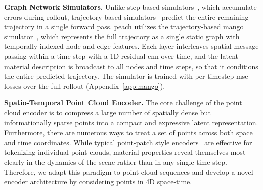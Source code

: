 \textbf{Graph Network Simulators.}
Unlike step-based simulators~\citep{pfaff2020learning, wurth2025diffusion}, which accumulate errors during rollout, trajectory-based simulators~\citep{dahlinger2025mango, dahlinger2025context, egno2024} predict the entire remaining trajectory in a single forward pass.
\gls{peach} utilizes the trajectory-based \gls{mango} simulator~\citep{dahlinger2025mango}, which represents the full trajectory as a single static graph with temporally indexed node and edge features. Each layer interleaves spatial message passing within a time step with a 1D residual \gls{cnn} over time, and the latent material description is broadcast to all nodes and time steps, so that it conditions the entire predicted trajectory. The simulator is trained with per-timestep \gls{mse} losses over the full rollout (Appendix~\ref{app:mango}).




\textbf{Spatio-Temporal Point Cloud Encoder.}
The core challenge of the point cloud encoder is to compress a large number of spatially dense but informationally sparse points into a compact and expressive latent representation.
Furthermore, there are numerous ways to treat a set of points across both space and time coordinates. 
While typical point-patch style encoders~\citep{pointMAE, pointBERT, pointGPT} are effective for tokenizing individual point clouds, material properties reveal themselves most clearly in the dynamics of the scene rather than in any single time step.
Therefore, we adapt this paradigm to point cloud sequences and develop a novel encoder architecture by considering points in 4D space-time.

